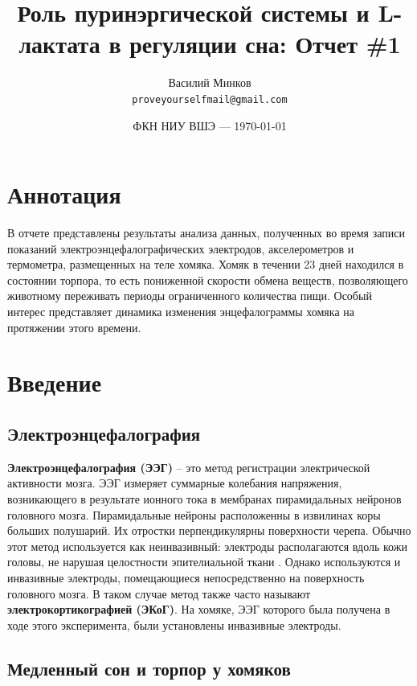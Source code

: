 \documentclass[12pt,a4paper,oneside]{article}
\title{Роль пуринэргической системы и L-лактата в регуляции сна: Отчет \#1} %
\author{Василий Минков\\ \texttt{proveyourselfmail@gmail.com}} %
\date{ФКН НИУ ВШЭ --- \today} %
\begin{document}
\maketitle %


\tableofcontents

\section{Аннотация}

В отчете представлены результаты анализа данных, полученных во время записи показаний электроэнцефалографических электродов, акселерометров и термометра, размещенных на теле хомяка. Хомяк в течении 23 дней находился в состоянии торпора, то есть пониженной скорости обмена веществ, позволяющего животному переживать периоды ограниченного количества пищи. Особый интерес представляет динамика изменения энцефалограммы хомяка на протяжении этого времени.

\newpage

\section{Введение}

\subsection{Электроэнцефалография}

\textbf{Электроэнцефалография (ЭЭГ)} -- это метод регистрации электрической активности мозга. ЭЭГ измеряет суммарные колебания напряжения, возникающего в результате ионного тока в мембранах пирамидальных нейронов головного мозга. Пирамидальные нейроны расположенны в извилинах коры больших полушарий. Их отростки перпендикулярны поверхности черепа. Обычно этот метод используется как неинвазивный: электроды располагаются вдоль кожи головы, не нарушая целостности эпителиальной ткани \cite{Luck2005}. Однако используются и инвазивные электроды, помещающиеся непосредственно на поверхность головного мозга. В таком случае метод также часто называют \textbf{электрокортикографией (ЭКоГ)}. На хомяке, ЭЭГ которого была получена в ходе этого эксперимента, были установлены инвазивные электроды.

\subsection{Медленный сон и торпор у хомяков}
\end{document}
